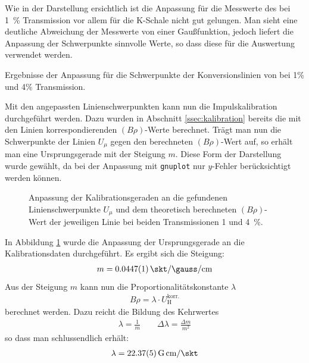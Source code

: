 \documentclass[11pt, a4paper]{article}
\numberwithin{equation}{section}
\begin{document}
Wie in der Darstellung ersichtlich ist die Anpassung für die Messwerte des bei \SI{1}{\percent} Transmission vor allem für die K-Schale nicht gut gelungen.
Man sieht eine deutliche Abweichung der Messwerte von einer Gaußfunktion, jedoch liefert die Anpassung der Schwerpunkte sinnvolle Werte, so dass diese für die Auswertung verwendet werden.
\begin{table}[ht]
	\centering
	
	\caption{Ergebnisse der Anpassung für die Schwerpunkte der Konversionslinien von  bei 1\% und 4\% Transmission.}
	\label{tab:fitergebnisse_ba}
\end{table}
Mit den angepassten Linienschwerpunkten kann nun die Impulskalibration durchgeführt werden.
Dazu wurden in Abschnitt \ref{ssec:kalibration} bereits die mit den Linien korrespondierenden $(B \rho)$-Werte berechnet.
Trägt man nun die Schwerpunkte der Linien $U_\mu$ gegen den berechneten $(B \rho)$-Wert auf, so erhält man eine Ursprungsgerade mit der Steigung $m$.
Diese Form der Darstellung wurde gewählt, da bei der Anpassung mit \texttt{gnuplot} nur $y$-Fehler berücksichtigt werden können.
\begin{figure}[htbp]
	\centering
	
	\caption{Anpassung der Kalibrationsgeraden an die gefundenen Linienschwerpunkte $U_\mu$ und dem theoretisch berechneten $(B \rho)$-Wert der jeweiligen Linie bei beiden Transmissionen \num{1} und \SI{4}{\percent}.}
	\label{fig:kalibration}
\end{figure}
In Abbildung \ref{fig:kalibration} wurde die Anpassung der Ursprungsgerade  an die Kalibrationsdaten durchgeführt.
Es ergibt sich die Steigung:
\begin{align}
	m = \SI{0.0447 +- 0.0001}{\skt\per \gauss \per \centi\metre}
\end{align}
Aus der Steigung $m$ kann nun die Proportionalitätskonstante $\lambda$
\begin{align}
	B \rho = \lambda \cdot U_\mathrm{H}^\mathrm{korr.}
\end{align}
berechnet werden.
Dazu reicht die Bildung des Kehrwertes
\begin{align}
	\lambda = \frac{1}{m} \qquad \Delta \lambda = \frac{\Delta m}{m^2}
\end{align}
so dass man schlussendlich erhält:
\begin{align}
	\lambda = \SI{22.37 +- 0.05}{G.cm\per\skt}
\end{align}
\end{document}
